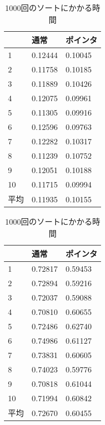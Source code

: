 \documentclass[autodetect-engine,dvi=dvipdfmx,ja=standard,
               a4j,11pt]{bxjsarticle}
\begin{document}
\begin{table}[t]
    \begin{minipage}[t]{.45\textwidth}
        \centering
        \begin{tabular}{|l|l|l|}
            \hline
            \textbf{} & \textbf{通常} & \textbf{ポインタ} \\
            \hline\hline
            1 & 0.12444 & 0.10045 \\
            \hline
            2 & 0.11758 & 0.10185 \\
            \hline
            3 & 0.11889 & 0.10426 \\
            \hline
            4 & 0.12075 & 0.09961 \\
            \hline
            5 & 0.11305 & 0.09916 \\
            \hline
            6 & 0.12596 & 0.09763 \\
            \hline
            7 & 0.12282 & 0.10317 \\
            \hline
            8 & 0.11239 & 0.10752 \\
            \hline
            9 & 0.12051 & 0.10188 \\
            \hline
            10 & 0.11715 & 0.09994 \\
            \hline\hline
            平均 & 0.11935 & 0.10155 \\
            \hline
        \end{tabular}
    \caption{100回のソートにかかる時間}
        \label{tab:time100}
    \end{minipage}
    \hfill
    \begin{minipage}[t]{.45\textwidth}
        \centering
        \begin{tabular}{|l|l|l|}
            \hline
            \textbf{} & \textbf{通常} & \textbf{ポインタ} \\
            \hline\hline
            1 & 0.72817 & 0.59453 \\
            \hline
            2 & 0.72894 & 0.59216 \\
            \hline
            3 & 0.72037 & 0.59088 \\
            \hline
            4 & 0.70810 & 0.60655 \\
            \hline
            5 & 0.72486 & 0.62740 \\
            \hline
            6 & 0.74986 & 0.61127 \\
            \hline
            7 & 0.73831 & 0.60605 \\
            \hline
            8 & 0.74023 & 0.59776 \\
            \hline
            9 & 0.70818 & 0.61044 \\
            \hline
            10 & 0.71994 & 0.60842 \\
            \hline\hline
            平均 & 0.72670 & 0.60455 \\
            \hline
        \end{tabular}
        \caption{1000回のソートにかかる時間}
        \label{tab:time1000}
    \end{minipage}
\end{table}
\end{document}

